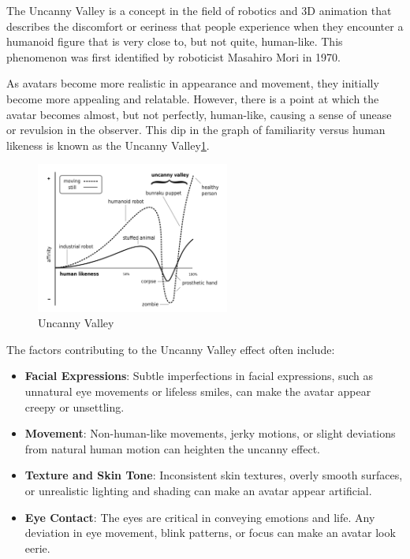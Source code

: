 The Uncanny Valley is a concept in the field of robotics and 3D animation that describes the discomfort or eeriness that people experience when they encounter a humanoid figure that is very close to, but not quite, human-like. This phenomenon was first identified by roboticist Masahiro Mori in 1970.

As avatars become more realistic in appearance and movement, they initially become more appealing and relatable. However, there is a point at which the avatar becomes almost, but not perfectly, human-like, causing a sense of unease or revulsion in the observer. This dip in the graph of familiarity versus human likeness is known as the Uncanny Valley\ref{fig:uncanny_valley_graph}.

\begin{figure}
  \centering \includegraphics[width = 2.5in]{images/background_work/uncanny_valley_graph.png}
  \caption{Uncanny Valley}
  \label{fig:uncanny_valley_graph}
\end{figure}

The factors contributing to the Uncanny Valley effect often include:
\begin{itemize}
  \item \textbf{Facial Expressions}: Subtle imperfections in facial expressions, such as unnatural eye movements or lifeless smiles, can make the avatar appear creepy or unsettling.
  \item \textbf{Movement}: Non-human-like movements, jerky motions, or slight deviations from natural human motion can heighten the uncanny effect.
  \item \textbf{Texture and Skin Tone}: Inconsistent skin textures, overly smooth surfaces, or unrealistic lighting and shading can make an avatar appear artificial.
  \item \textbf{Eye Contact}: The eyes are critical in conveying emotions and life. Any deviation in eye movement, blink patterns, or focus can make an avatar look eerie.
\end{itemize}

